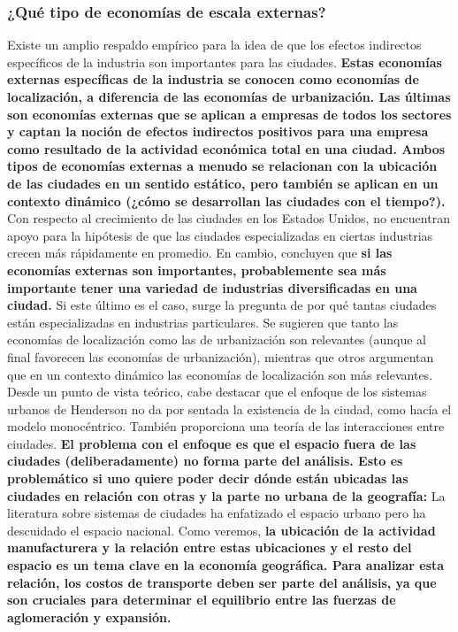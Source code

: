 \subsubsection{¿Qué tipo de economías de escala externas?}
Existe un amplio respaldo empírico para la idea de que los efectos indirectos específicos de la industria son importantes para las ciudades. \textbf{Estas economías externas específicas de la industria se conocen como economías de localización, a diferencia de las economías de urbanización. Las últimas son economías externas que se aplican a empresas de todos los sectores y captan la noción de efectos indirectos positivos para una empresa como resultado de la actividad económica total en una ciudad. Ambos tipos de economías externas a menudo se relacionan con la ubicación de las ciudades en un sentido estático, pero también se aplican en un contexto dinámico (¿cómo se desarrollan las ciudades con el tiempo?).} Con respecto al crecimiento de las ciudades en los Estados Unidos, no encuentran apoyo para la hipótesis de que las ciudades especializadas en ciertas industrias crecen más rápidamente en promedio. En cambio, concluyen que \textbf{si las economías externas son importantes, probablemente sea más importante tener una variedad de industrias diversificadas en una ciudad.} Si este último es el caso, surge la pregunta de por qué tantas ciudades están especializadas en industrias particulares. Se sugieren que tanto las economías de localización como las de urbanización son relevantes (aunque al final favorecen las economías de urbanización), mientras que otros argumentan que en un contexto dinámico las economías de localización son más relevantes.\\
Desde un punto de vista teórico, cabe destacar que el enfoque de los sistemas urbanos de Henderson no da por sentada la existencia de la ciudad, como hacía el modelo monocéntrico. También proporciona una teoría de las interacciones entre ciudades. \textbf{El problema con el enfoque es que el espacio fuera de las ciudades (deliberadamente) no forma parte del análisis. Esto es problemático si uno quiere poder decir dónde están ubicadas las ciudades en relación con otras y la parte no urbana de la geografía:} La literatura sobre sistemas de ciudades ha enfatizado el espacio urbano pero ha descuidado el espacio nacional. Como veremos, \textbf{la ubicación de la actividad manufacturera y la relación entre estas ubicaciones y el resto del espacio es un tema clave en la economía geográfica. Para analizar esta relación, los costos de transporte deben ser parte del análisis, ya que son cruciales para determinar el equilibrio entre las fuerzas de aglomeración y expansión.}\\
